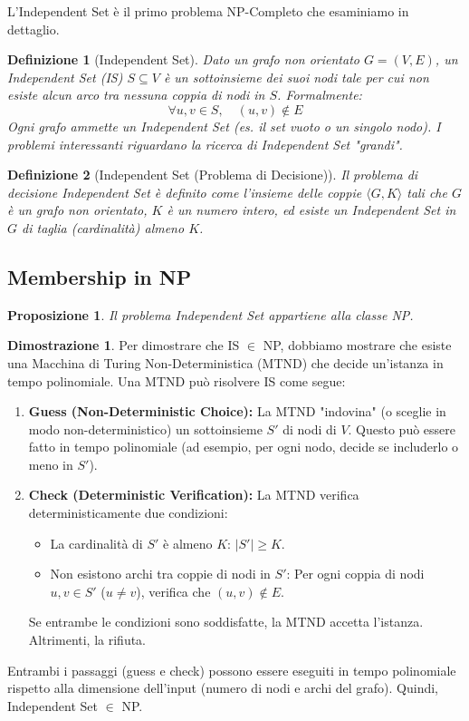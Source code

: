 \documentclass[a4paper]{article}
\newtheorem{definition}{Definizione}[section]
\newtheorem{proposition}{Proposizione}[section]
\theoremstyle{definition} %
\newtheorem*{proof*}{Dimostrazione}
\begin{document}
L'Independent Set è il primo problema NP-Completo che esaminiamo in dettaglio.

\begin{definition}[Independent Set]
Dato un grafo non orientato $G=(V, E)$, un \emph{Independent Set} (IS) $S \subseteq V$ è un sottoinsieme dei suoi nodi tale per cui non esiste alcun arco tra nessuna coppia di nodi in $S$. Formalmente:
\[ \forall u, v \in S, \quad (u, v) \notin E \]
Ogni grafo ammette un Independent Set (es. il set vuoto o un singolo nodo). I problemi interessanti riguardano la ricerca di Independent Set "grandi".
\end{definition}

\begin{definition}[Independent Set (Problema di Decisione)]
Il problema di decisione \emph{Independent Set} è definito come l'insieme delle coppie $\langle G, K \rangle$ tali che $G$ è un grafo non orientato, $K$ è un numero intero, ed esiste un Independent Set in $G$ di taglia (cardinalità) almeno $K$.
\end{definition}

\subsection{Membership in NP}

\begin{proposition}
Il problema \emph{Independent Set} appartiene alla classe NP.
\end{proposition}

\begin{proof*}
Per dimostrare che IS $\in$ NP, dobbiamo mostrare che esiste una Macchina di Turing Non-Deterministica (MTND) che decide un'istanza in tempo polinomiale.
Una MTND può risolvere IS come segue:
\begin{enumerate}
    \item \textbf{Guess (Non-Deterministic Choice):} La MTND "indovina" (o sceglie in modo non-deterministico) un sottoinsieme $S'$ di nodi di $V$. Questo può essere fatto in tempo polinomiale (ad esempio, per ogni nodo, decide se includerlo o meno in $S'$).
    \item \textbf{Check (Deterministic Verification):} La MTND verifica deterministicamente due condizioni:
    \begin{itemize}
        \item La cardinalità di $S'$ è almeno $K$: $|S'| \ge K$.
        \item Non esistono archi tra coppie di nodi in $S'$: Per ogni coppia di nodi $u, v \in S'$ ($u \ne v$), verifica che $(u, v) \notin E$.
    \end{itemize}
    Se entrambe le condizioni sono soddisfatte, la MTND accetta l'istanza. Altrimenti, la rifiuta.
\end{enumerate}
Entrambi i passaggi (guess e check) possono essere eseguiti in tempo polinomiale rispetto alla dimensione dell'input (numero di nodi e archi del grafo). Quindi, Independent Set $\in$ NP.
\end{proof*}
\end{document}
